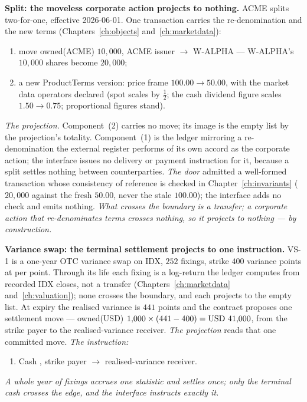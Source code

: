 \medskip\noindent\textbf{Split: the moveless corporate action projects to nothing.}
ACME splits two-for-one, effective 2026-06-01. One transaction carries the
re-denomination and the new terms (Chapters~\ref{ch:objects} and~\ref{ch:marketdata}):
\begin{enumerate}[label=(\arabic*),nosep]
\item move owned(ACME) $10{,}000$, ACME issuer $\to$ W-ALPHA --- W-ALPHA's
$10{,}000$ shares become $20{,}000$;
\item a new ProductTerms version: price frame $100.00 \to 50.00$, with the market
data operators declared (spot scales by $\tfrac12$; the cash dividend figure scales
$1.50 \to 0.75$; proportional figures stand).
\end{enumerate}
\emph{The projection.} Component~(2) carries no move; its image is the empty list by
the projection's totality. Component~(1) is the ledger mirroring a re-denomination
the external register performs of its own accord as the corporate action; the
interface issues no delivery or payment instruction for it, because a split settles
nothing between counterparties.
\emph{The door} admitted a well-formed transaction whose consistency of reference
is checked in Chapter~\ref{ch:invariants} ($20{,}000$ against the fresh $50.00$,
never the stale $100.00$); the interface adds no check and emits nothing.
\emph{What crosses the boundary is a transfer; a corporate action that
re-denominates terms crosses nothing, so it projects to nothing --- by
construction.}

\medskip\noindent\textbf{Variance swap: the terminal settlement projects to one
instruction.} VS-1 is a one-year OTC variance swap on IDX, $252$ fixings, strike $400$
variance points at  per point. Through its life each fixing is a
log-return the ledger computes from recorded IDX closes, not a transfer
(Chapters~\ref{ch:marketdata} and~\ref{ch:valuation}); none crosses the boundary,
and each projects to the empty list. At expiry the realised variance is $441$ points and the contract proposes one
settlement move --- owned(USD) $1{,}000\times(441-400) = \mbox{USD~41{,}000}$, from the
strike payer to the realised-variance receiver.
\emph{The projection} reads that one committed move.
\emph{The instruction:}
\begin{enumerate}[label=(\arabic*),nosep]
\item Cash , strike payer $\to$ realised-variance receiver.
\end{enumerate}
\emph{A whole year of fixings accrues one statistic and settles once; only the terminal
cash crosses the edge, and the interface instructs exactly it.}

